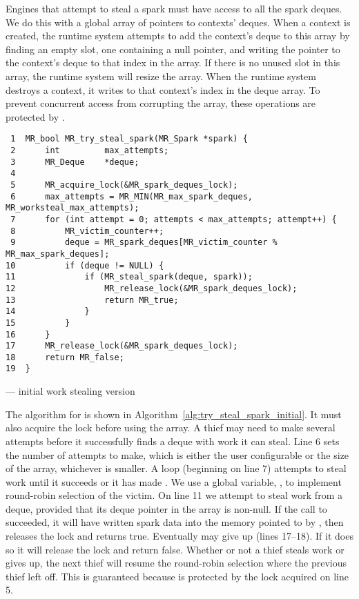 Engines that attempt to steal a spark must have access to all the spark
deques.
We do this with a global array of pointers to contexts' deques.
When a context is created,
the runtime system attempts to add the context's deque to this array by
finding an empty slot,
one containing a null pointer,
and writing the pointer to the context's deque to that index in the array.
If there is no unused slot in this array, the runtime system will resize the
array.
When the runtime system destroys a context,
it writes \NULL to that context's index in the deque array.
To prevent concurrent access from corrupting the array,
these operations are protected by .

\begin{algorithm}[tbp]
\begin{verbatim}
 1  MR_bool MR_try_steal_spark(MR_Spark *spark) {
 2      int         max_attempts;
 3      MR_Deque    *deque;
 4
 5      MR_acquire_lock(&MR_spark_deques_lock);
 6      max_attempts = MR_MIN(MR_max_spark_deques, MR_worksteal_max_attempts);
 7      for (int attempt = 0; attempts < max_attempts; attempt++) {
 8          MR_victim_counter++;
 9          deque = MR_spark_deques[MR_victim_counter % MR_max_spark_deques];
10          if (deque != NULL) {
11              if (MR_steal_spark(deque, spark));
12                  MR_release_lock(&MR_spark_deques_lock);
13                  return MR_true;
14              }
15          }
16      }
17      MR_release_lock(&MR_spark_deques_lock);
18      return MR_false;
19  }
\end{verbatim}
\caption{\trystealspark --- initial work stealing version} 
\label{alg:try_steal_spark_initial}
\end{algorithm}

The algorithm for \trystealspark is shown in
Algorithm~\ref{alg:try_steal_spark_initial}.
It must also acquire the lock before using the array.
A thief may need to make several attempts before it successfully finds a
deque with work it can steal.
Line 6 sets the number of attempts to make, which is either the user
configurable  or the size of the array,
whichever is smaller.
A loop (beginning on line 7) attempts to steal work until it succeeds or it
has made .
We use a global variable, ,
to implement round-robin selection of the victim.
On line 11 we attempt to steal work from a deque,
provided that its deque pointer in the array is non-null.
If the call to \steal succeeded,
it will have written spark data into the memory pointed to by
,
then \trystealspark releases the lock and returns true.
Eventually \trystealspark may give up (lines 17--18).
If it does so it will release the lock and return false.
Whether or not a thief steals work or gives up,
the next thief will resume the round-robin selection where the previous
thief left off.
This is guaranteed because  is protected by the
lock acquired on line 5.

